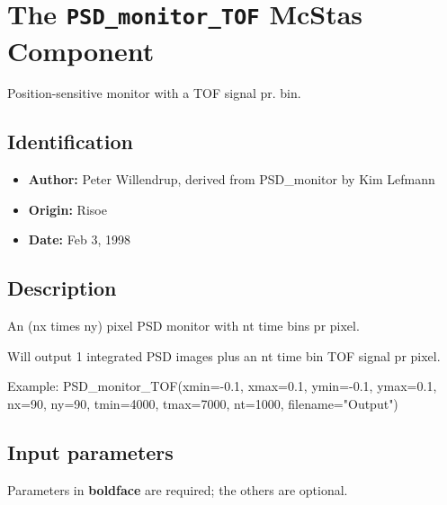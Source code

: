 \section{The \texttt{PSD\_monitor\_TOF} McStas Component}
Position-sensitive monitor with a TOF signal pr. bin.

\subsection*{Identification}
\begin{itemize}
  \item \textbf{Author:} Peter Willendrup, derived from PSD\_monitor by Kim Lefmann
  \item \textbf{Origin:} Risoe
  \item \textbf{Date:} Feb 3, 1998
\end{itemize}

\subsection*{Description}
An (nx times ny) pixel PSD monitor with nt time bins pr pixel.

Will output 1 integrated PSD images plus an nt time bin TOF signal pr pixel.

Example: PSD\_monitor\_TOF(xmin=-0.1, xmax=0.1, ymin=-0.1, ymax=0.1, nx=90, ny=90, tmin=4000, tmax=7000, nt=1000, filename="Output")

\subsection*{Input parameters}
Parameters in \textbf{boldface} are required; the others are optional.

